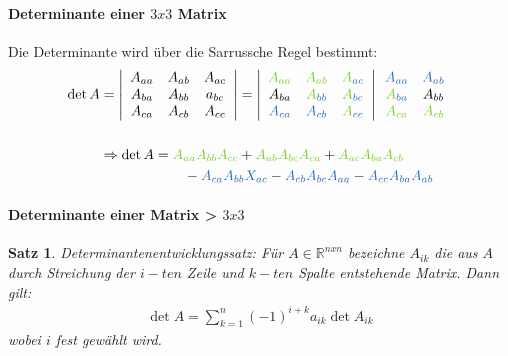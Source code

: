 \documentclass[12pt,a4paper]{article}%
\newtheorem{satz}{Satz}[section]
\numberwithin{equation}{section}
\newcommand{\R}{\mathbb{R}} %
\newcommand{\subsubsubsection}{\paragraph}
\def\colGreen#1{\begingroup\color{LimeGreen}{#1}\endgroup}
\def\colBlue#1{\begingroup\color{NavyBlue}{#1}\endgroup}
\numberwithin{equation}{subsection}
\begin{document}
	  \subsubsubsection{Determinante einer $3x3$ Matrix}
	  Die Determinante wird über die Sarrussche Regel bestimmt:
  \begin{align}
    \det A &= \left|
      \begin{array}{c c c}
      A_{aa} & A_{ab} & A_{ac}\\
      A_{ba} & A_{bb} & a_{bc}\\
      A_{ca} & A_{cb} & A_{cc}\\
      \end{array}
    \right|    
    = \left|
      \begin{array}{c c c}
      \colGreen{A_{aa}} & \colGreen{A_{ab}} & \colGreen{A}_{\colBlue{ac}}\\
      A_{ba} & \colGreen{A}_{\colBlue{bb}} & \colGreen{A}_{\colBlue{bc}}\\
      \colBlue{A_{ca}} & \colBlue{A_{cb}} & \colGreen{A}_{\colBlue{cc}}\\
      \end{array}
    \right| 
    \begin{array}{c c}
      \colBlue{A_{aa}} & \colBlue{A_{ab}}\\
      \colGreen{A}_{\colBlue{ba}} & A_{bb}\\
      \colGreen{A_{ca}} & \colGreen{A_{cb}}\\
    \end{array} \nonumber \\
    \nonumber \\
    &\Rightarrow \det A =   \colGreen{A_{aa}} \colGreen{A_{bb}} \colGreen{A_{cc}} 
      + \colGreen{A_{ab}}   \colGreen{A_{bc}} \colGreen{A_{ca}}
      + \colGreen{A_{ac}}   \colGreen{A_{ba}} \colGreen{A_{cb}} \nonumber \\
      &\qquad \qquad \qquad- \colBlue{A_{ca}}    \colBlue{A_{bb}}  \colBlue{X_{ac}} 
      - \colBlue{A_{cb}}    \colBlue{A_{bc}}  \colBlue{A_{aa}}
      - \colBlue{A_{cc}}    \colBlue{A_{ba}}  \colBlue{A_{ab}}
  \end{align}
  
  \subsubsubsection{Determinante einer Matrix > $3x3$}
  \begin{satz}
    Determinantenentwicklungssatz: Für $A \in \R^{nxn}$ bezeichne $A_{ik}$ die aus $A$ durch Streichung der $i-ten$ Zeile und $k-ten$ Spalte entstehende Matrix. Dann gilt:
    \begin{align*}
      \det A = \sum_{k=1}^{n} (-1)^{i+k} a_{ik}\det A_{ik}
    \end{align*}
    wobei $i$ fest gewählt wird.
  \end{satz}
  
\end{document}
